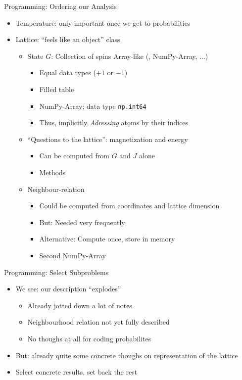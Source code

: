 \begin{frame}[fragile]{Programming: Ordering our Analysis}
%
\begin{itemize}
\item Temperature: only important once we get to probabilities
\item Lattice: \enquote{feels like an object} \Thus class
	\begin{itemize}
	\item State $G$: Collection of spins \Thus Array-like (, NumPy-Array, ...)
		\begin{itemize}
		\item Equal data types ($+1$ or $-1$)
		\item Filled table
		\item[\Thus] NumPy-Array; data type \texttt{np.int64}
		\item Thus, implicitly \emph{Adressing} atoms by their indices
		\end{itemize}
	\item \enquote{Questions to the lattice}: magnetization and energy
		\begin{itemize}
		\item Can be computed from $G$ and $J$ alone
		\item[\Thus] Methods
		\end{itemize}
	\item Neighbour-relation
		\begin{itemize}
		\item Could be computed from coordinates and lattice dimension
		\item But: Needed very frequently
		\item Alternative: Compute once, store in memory
		\item[\Thus] Second NumPy-Array
		\end{itemize}
	\end{itemize}
\end{itemize}
%
\end{frame}


\begin{frame}{Programming: Select Subproblems}
%
\begin{itemize}
\item We see: our description \enquote{explodes} 
	\begin{itemize}
	\item Already jotted down a lot of notes
	\item Neighbourhood relation not yet fully described
	\item No thoughs at all for coding probabilites
	\end{itemize}
\item But: already quite some concrete thoughs on representation of the lattice
\item[\Thus] Select concrete results, set back the rest
\end{itemize}
%
\end{frame}

